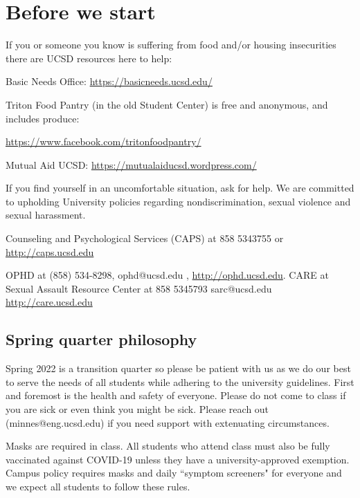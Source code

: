 \documentclass[12pt, oneside]{article}
\begin{document}
\begin{flushright}
\end{flushright} 
\section*{Before we start}
If you or someone you know is suffering from food and/or housing insecurities 
there are UCSD resources here to help:

Basic Needs Office: \href{https://basicneeds.ucsd.edu/}{https://basicneeds.ucsd.edu/}

Triton Food Pantry (in the old Student Center)
is free and anonymous, and includes produce: 

\href{https://www.facebook.com/tritonfoodpantry/}{https://www.facebook.com/tritonfoodpantry/}

Mutual Aid UCSD: \href{https://mutualaiducsd.wordpress.com/}{https://mutualaiducsd.wordpress.com/}

If you find yourself in an uncomfortable situation, ask for help. 
We are committed to upholding University policies regarding nondiscrimination, sexual violence and sexual harassment.

Counseling and Psychological Services (CAPS) at 858 5343755 or \href{http://caps.ucsd.edu}{http://caps.ucsd.edu}


OPHD at (858) 534-8298, ophd@ucsd.edu , \href{http://ophd.ucsd.edu}{http://ophd.ucsd.edu}. 
CARE at Sexual Assault Resource Center at 858 5345793 sarc@ucsd.edu \href{http://care.ucsd.edu}{http://care.ucsd.edu}

\subsection*{Spring quarter philosophy}
Spring 2022 is a transition quarter so please be patient with us as we do our best 
to serve the needs of all students while adhering to the university guidelines. 
First and foremost is the health and safety of everyone.  
Please do not come to class if you are sick or even think you might be sick.
Please reach out (minnes@eng.ucsd.edu) if you need support with extenuating circumstances.

Masks are required in class. All students who attend class must also be fully vaccinated against COVID-19
unless they have a university-approved exemption.
Campus policy requires masks and daily ``symptom screeners" for everyone and we expect all students 
to follow these rules. 
\end{document}
